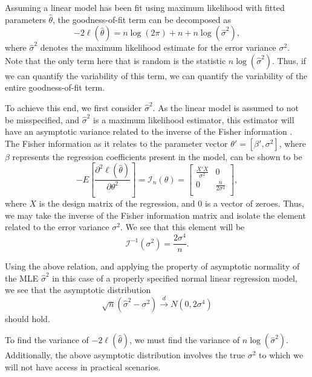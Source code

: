 \documentclass[submit]{smj}
\begin{document}
		Assuming a linear model has been fit using maximum likelihood with fitted parameters $\hat{\theta}$, the goodness-of-fit term can be decomposed as
		\begin{equation}
			-2 \ell (\hat{\theta}  ) = n \log(2 \pi) + n + n \log(\hat{\sigma}^2 ) ,
		\end{equation}
		where $\hat{\sigma}^2$ denotes the maximum likelihood estimate for the error variance $\sigma^2$. Note that the only term here that is random is
		the statistic $n \log(\hat{\sigma}^2)$. Thus, if we can quantify the variability of this term, we can quantify the variability of the entire goodness-of-fit
		term.

		To achieve this end, we first consider $\hat{\sigma}^2$. As the linear model is assumed to not be misspecified, and $\hat{\sigma}^2$ is a maximum likelihood
		estimator, this estimator will have an asymptotic variance related to the inverse of the Fisher information \citep{Fisher}. The Fisher information as it relates
		to the parameter vector $\theta' = [\beta', \sigma^2]$, where $\beta$ represents the regression coefficients
		present in the model, can be shown to be
		\begin{equation*}
			- E \left[ \frac{\partial^2 \ell (\hat{\theta}  )}{\partial \theta^2} \right] = \mathcal{I}_{n}(\theta) =
			\begin{bmatrix}
				\frac{X' X}{\sigma^2} & 0 \\
				0 & \frac{n}{2 \sigma^4} \\
			\end{bmatrix}
			,
		\end{equation*}
		where $X$ is the design matrix of the regression, and $0$ is a vector of zeroes. Thus, we may take the inverse of the Fisher information matrix and isolate
		the element related to the error variance $\sigma^2$. We see that this element will be
		\begin{equation*}
			\mathcal{I}^{-1}(\sigma ^2) = \frac{2 \sigma ^4}{n} .
		\end{equation*}
		
		Using the above relation, and applying the property of asymptotic normality of the MLE $\hat{\sigma}^2$ in this case of a properly specified normal linear
		regression model, we see that the asymptotic distribution
		\begin{equation*}
			\sqrt{n} (\hat{\sigma}^2 - \sigma^2) \xrightarrow[]{d} N(0, 2 \sigma ^4 )
		\end{equation*}
		should hold.

		To find the variance of $-2 \ell (\hat{\theta}  )$, we must find the variance of $n \log(\hat{\sigma}^2)$.
		Additionally, the above asymptotic distribution involves the true $\sigma^2$ to which we will not have access in practical scenarios.
\end{document}
